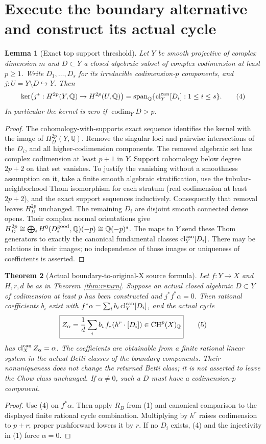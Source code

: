 \documentclass[11pt]{article}
\newtheorem{theorem}{Theorem}
\newtheorem{lemma}[theorem]{Lemma}
\newcommand{\Q}{\mathbb Q}
\newcommand{\CH}{\operatorname{CH}}
\newcommand{\cl}{\operatorname{cl}^{\rm can}}
\begin{document}
\section{Execute the boundary alternative and construct its actual cycle}
\begin{lemma}[Exact top support threshold]\label{lem:support}
Let $Y$ be smooth projective of complex dimension $m$ and $D\subset Y$
a closed algebraic subset of complex codimension at least $p\ge1$.
Write $D_1,\ldots,D_s$ for its irreducible codimension-$p$ components,
and $j:U=Y\setminus D\hookrightarrow Y$. Then
\[
 \ker\bigl(j^*:H^{2p}(Y,\Q)\to H^{2p}(U,\Q)\bigr)
 =\operatorname{span}_\Q\{\cl_Y[D_i]:1\le i\le s\}.       \tag{4}
\]
In particular the kernel is zero if $\operatorname{codim}_Y D>p$.
\end{lemma}
\begin{proof}
The cohomology-with-supports exact sequence identifies the kernel with
the image of $H_D^{2p}(Y,\Q)$. Remove the singular loci and pairwise
intersections of the $D_i$, and all higher-codimension components. The
removed algebraic set has complex codimension at least $p+1$ in $Y$.
Support cohomology below degree $2p+2$ on that set vanishes. To justify
the vanishing without a smoothness assumption on it, take a finite smooth
algebraic stratification, use the tubular-neighborhood Thom isomorphism
for each stratum (real codimension at least $2p+2$), and the exact
support sequences inductively. Consequently that removal leaves
$H_D^{2p}$ unchanged. The remaining $D_i$ are disjoint smooth connected
dense opens. Their complex normal orientations give
$H_D^{2p}\cong\bigoplus_i H^0(D_i^{\rm good},\Q)(-p)
\cong\Q(-p)^s$. The maps to $Y$ send these Thom generators to exactly
the canonical fundamental classes $\cl_Y[D_i]$.
There may be relations in their images; no independence of those images
or uniqueness of coefficients is asserted.
\end{proof}

\begin{theorem}[Actual boundary-to-original-X source formula]\label{thm:boundary}
Let $f:Y\to X$ and $H,r,d$ be as in Theorem~\ref{thm:return}.
Suppose an actual closed algebraic $D\subset Y$ of codimension at least
$p$ has been constructed and $j^*f^*\alpha=0$. Then rational coefficients
$b_i$ exist with $f^*\alpha=\sum_i b_i\cl_Y[D_i]$, and the actual cycle
\[
 \boxed{Z_\alpha={1\over d}\sum_i b_i\,
                f_*(h^r\cdot[D_i])\in\CH^p(X)_\Q}       \tag{5}
\]
has $\cl_X Z_\alpha=\alpha$. The coefficients are obtainable from a
finite rational linear system in the actual Betti classes of the boundary
components. Their nonuniqueness does not change the returned Betti class;
it is not asserted to leave the Chow class unchanged.
If $\alpha\ne0$, such a $D$ must have a codimension-$p$ component.
\end{theorem}
\begin{proof}
Use (4) on $f^*\alpha$. Then apply $R_B$ from (1) and canonical
comparison to the displayed finite rational cycle combination. Multiplying
by $h^r$ raises codimension to $p+r$; proper pushforward lowers it by $r$.
If no $D_i$ exists, (4) and the injectivity in (1) force $\alpha=0$.
\end{proof}
\end{document}
